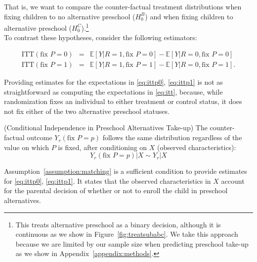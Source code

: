 \noindent That is, we want to compare the counter-factual treatment distributions when fixing children to no alternative preschool ($H_{0}^B$) and when fixing children to alternative preschool ($H_{0}^C$).\footnote{This treats alternative preschool as a binary decision, although it is continuous as we show in Figure~\ref{fig:treatsubabc}. We take this approach because we are limited by our sample size when predicting preschool take-up as we show in Appendix~\ref{appendix:methods}.}\\

\noindent To contrast these hypotheses, consider the following estimators: 

\begin{eqnarray}
\text{ITT} \left( \text{fix } P = 0 \right) &=& \mathbb{E} \left[ Y | R = 1, \text{fix } P = 0 \right] - \mathbb{E} \left[ Y | R = 0, \text{fix } P = 0 \right] \label{eq:ittp0} \\
\text{ITT} \left( \text{fix } P = 1 \right) &=& \mathbb{E} \left[ Y | R = 1, \text{fix } P = 1 \right] - \mathbb{E} \left[ Y | R = 0, \text{fix } P = 1 \right]. \label{eq:ittp1}  
\end{eqnarray}

\noindent Providing estimates for the expectations in \eqref{eq:ittp0}, \eqref{eq:ittp1} is not as straightforward as computing the expectations in \eqref{eq:itt}, because, while randomization fixes an individual to either treatment or control status, it does not fix either of the two alternative preschool statuses.\\

\begin{assumption} \normalfont \label{assumption:matching} (Conditional Independence in Preschool Alternatives Take-up) The counter-factual outcome $Y_{r} \left( \text{fix } P=p \right)$ follows the same distribution regardless of the value on which $P$ is fixed, after conditioning on $X$ (observed characteristics): 
\begin{equation}
Y_{r} \left( \text{fix } P=p \right) | X \sim Y_{r}  | X 
\end{equation}
 \end{assumption}

\noindent Assumption~\ref{assumption:matching} is a sufficient condition to provide estimates for \eqref{eq:ittp0}, \eqref{eq:ittp1}.  It states that the observed characteristics in $X$ account for the parental decision of whether or not to enroll the child in preschool alternatives.\\

